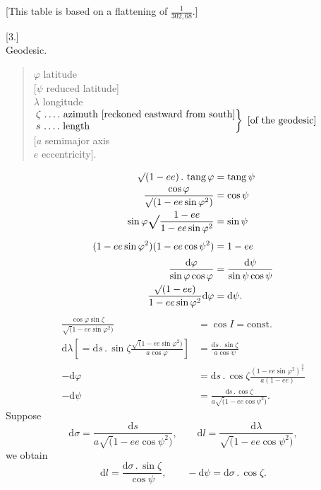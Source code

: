 \begin{center}
[This table is based on a flattening of \(\frac1{302{,}68}\).]
\end{center}

\par\clearpage
\noindent{}\makebox[12mm][r]{}\par\medskip

\begin{center}
[3.]\\[.5ex]
Geodesic.
\end{center}
\begin{quote}
\noindent \(\varphi\)  latitude\\
{[}\(\psi\)  reduced latitude]\\
\(\lambda\)  longitude\\
\(\left.
\begin{array}{@{}l@{}}
\zeta\ \text{\ixpoints{4} azimuth [reckoned eastward from south]}\\
s\ \text{\ixpoints{4} length}
\end{array}
\right\}\ \text{[of the geodesic]}\)\\
{[}\(a\)  semimajor axis\\
\(e\)  eccentricity].
\end{quote}
\[
\begin{aligned}
\surd(1-ee)\,.\,\operatorname{tang}\varphi&=\operatorname{tang}\psi\\
\frac{\cos\varphi}{\surd(1-ee\sin\varphi^2)}&=\cos\psi\\
\sin\varphi\ixrad\frac{1-ee}{1-ee\sin\varphi^2}&=\sin\psi\\
(1-ee\sin\varphi^2)(1-ee\cos\psi^2)&=1-ee\\
\frac{\mathrm d\varphi}{\sin\varphi\cos\varphi}
&=\frac{\mathrm d\psi}{\sin\psi\cos\psi}\\
\frac{\surd(1-ee)}{1-ee\sin\varphi^2}\mathrm d\varphi&=\mathrm d\psi.
\end{aligned}
\]
\noindent [We have]
\[
\begin{aligned}
\frac{\cos\varphi\sin\zeta}{\surd(1-ee\sin\varphi^2)}&=\cos I=\text{const.}\\
\mathrm d\lambda
\left[=\mathrm ds\,.\,\sin\zeta\frac{\surd(1-ee\sin\varphi^2)}{a\cos\varphi}\right]
&=\frac{\mathrm ds\,.\,\sin\zeta}{a\cos\psi}\\
-\mathrm d\varphi
&=\mathrm ds\,.\,\cos\zeta\frac{(1-ee\sin\varphi^2)^{\frac32}}{a(1-ee)}\\
-\mathrm d\psi&=\frac{\mathrm ds\,.\,\cos\zeta}{a\surd(1-ee\cos\psi^2)}.
\end{aligned}
\]
Suppose
\[
\mathrm d\sigma=\frac{\mathrm ds}{a\surd(1-ee\cos\psi^2)},\qquad
\mathrm dl=\frac{\mathrm d\lambda}{\surd(1-ee\cos\psi^2)},
\]
\noindent we obtain
\[
\mathrm dl=\frac{\mathrm d\sigma\,.\,\sin\zeta}{\cos\psi},\qquad
-\mathrm d\psi=\mathrm d\sigma\,.\,\cos\zeta.
\]
\noindent [Since]
\noindent [we have]
\par


